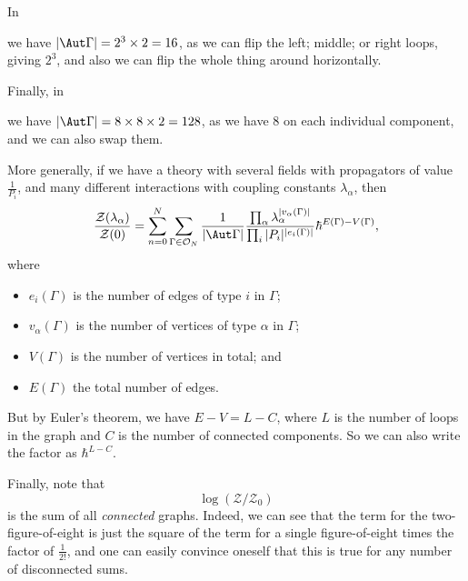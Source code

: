 \documentclass[a4paper]{article}
\begin{document}
In
\begin{center}
\end{center}
we have $|\Aut\Gamma| = 2^3 \times 2 = 16$, as we can flip the left; middle; or right loops, giving $2^3$, and also we can flip the whole thing around horizontally.

Finally, in
\begin{center}
\end{center}
we have $|\Aut\Gamma| = 8 \times 8 \times 2 = 128$, as we have $8$ on each individual component, and we can also swap them.

More generally, if we have a theory with several fields with propagators of value $\frac{1}{P_i}$, and many different interactions with coupling constants $\lambda_\alpha$, then
\[
  \frac{\mathcal{Z}(\lambda_\alpha)}{ \mathcal{Z}(0)} = \sum_{n = 0}^N \sum_{\Gamma \in \mathcal{O}_N} \frac{1}{|\Aut \Gamma|} \frac{\prod_\alpha \lambda_\alpha^{|v_\alpha(\Gamma)|}}{\prod_i |P_i|^{|e_i(\Gamma)|}} \hbar^{E(\Gamma) - V(\Gamma)},
\]
where
\begin{itemize}
  \item $e_i(\Gamma)$ is the number of edges of type $i$ in $\Gamma$;
  \item $v_\alpha(\Gamma)$ is the number of vertices of type $\alpha$ in $\Gamma$;
  \item $V(\Gamma)$ is the number of vertices in total; and
  \item $E(\Gamma)$ the total number of edges.
\end{itemize}
But by Euler's theorem, we have $E - V = L - C$, where $L$ is the number of loops in the graph and $C$ is the number of connected components. So we can also write the factor as $\hbar^{L - C}$.

Finally, note that
\[
  \log (\mathcal{Z}/\mathcal{Z}_0)
\]
is the sum of all \emph{connected} graphs. Indeed, we can see that the term for the two-figure-of-eight is just the square of the term for a single figure-of-eight times the factor of $\frac{1}{2!}$, and one can easily convince oneself that this is true for any number of disconnected sums.
\end{document}
